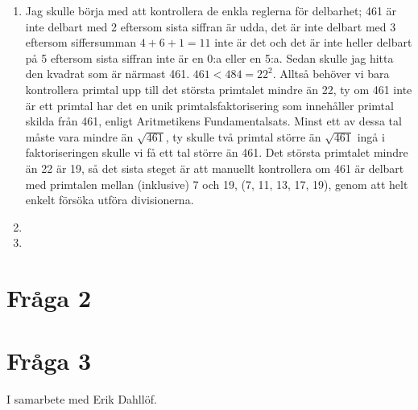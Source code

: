 \documentclass{article}
\begin{document}
\begin{enumerate}[label=(\alph*)]
	\item
		Jag skulle börja med att kontrollera de enkla reglerna för delbarhet; 461 är inte delbart med 2 eftersom sista siffran är udda, det är inte delbart med 3 eftersom siffersumman $4 + 6 + 1 = 11$ inte är det och det är inte heller delbart på 5 eftersom sista siffran inte är en 0:a eller en 5:a. Sedan skulle jag hitta den kvadrat som är närmast 461. $461 < 484 = 22^2$. Alltså behöver vi bara kontrollera primtal upp till det största primtalet mindre än 22, ty om 461 inte är ett primtal har det en unik primtalsfaktorisering som innehåller primtal skilda från 461, enligt Aritmetikens Fundamentalsats. Minst ett av dessa tal måste vara mindre än $\sqrt{461}$, ty skulle två primtal större än $\sqrt{461}$ ingå i faktoriseringen skulle vi få ett tal större än 461. Det största primtalet mindre än 22 är 19, så det sista steget är att manuellt kontrollera om 461 är delbart med primtalen mellan (inklusive) 7 och 19, (7, 11, 13, 17, 19), genom att helt enkelt försöka utföra divisionerna.

	\item

	\item

\end{enumerate}

\section{Fråga 2}

\section{Fråga 3}
I samarbete med Erik Dahllöf.
\end{document}
